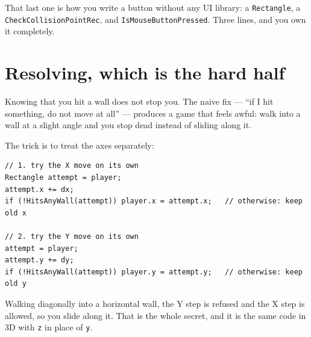 That last one is how you write a button without any UI library: a
\lstinline|Rectangle|, a \lstinline|CheckCollisionPointRec|, and
\lstinline|IsMouseButtonPressed|. Three lines, and you own it completely.

\section{Resolving, which is the hard half}

Knowing that you hit a wall does not stop you. The naive fix --- ``if I hit
something, do not move at all'' --- produces a game that feels awful: walk into a
wall at a slight angle and you stop dead instead of sliding along it.

The trick is to treat the axes separately:

\begin{center}
\end{center}

\begin{lstlisting}
// 1. try the X move on its own
Rectangle attempt = player;
attempt.x += dx;
if (!HitsAnyWall(attempt)) player.x = attempt.x;   // otherwise: keep old x

// 2. try the Y move on its own
attempt = player;
attempt.y += dy;
if (!HitsAnyWall(attempt)) player.y = attempt.y;   // otherwise: keep old y
\end{lstlisting}

Walking diagonally into a horizontal wall, the Y step is refused and the X step
is allowed, so you slide along it. That is the whole secret, and it is the same
code in 3D with \lstinline|z| in place of \lstinline|y|.


